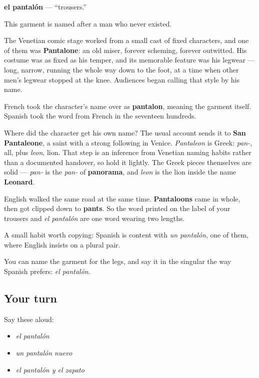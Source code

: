\begin{cousinweb}
\textbf{el pantalón} — \textquotedblleft{}trousers.\textquotedblright{}

This garment is named after a man who never existed.

The Venetian comic stage worked from a small cast of fixed characters, and one of them was \textbf{Pantalone}: an old miser, forever scheming, forever outwitted. His costume was as fixed as his temper, and its memorable feature was his legwear — long, narrow, running the whole way down to the foot, at a time when other men's legwear stopped at the knee. Audiences began calling that style by his name.

French took the character's name over as \textbf{pantalon}, meaning the garment itself. Spanish took the word from French in the seventeen hundreds.

Where did the character get his own name? The usual account sends it to \textbf{San Pantaleone}, a saint with a strong following in Venice. \emph{Pantaleon} is Greek: \emph{pan-}, all, plus \emph{leon}, lion. That step is an inference from Venetian naming habits rather than a documented handover, so hold it lightly. The Greek pieces themselves are solid — \emph{pan-} is the \emph{pan-} of \textbf{panorama}, and \emph{leon} is the lion inside the name \textbf{Leonard}.

English walked the same road at the same time. \textbf{Pantaloons} came in whole, then got clipped down to \textbf{pants}. So the word printed on the label of your trousers and \emph{el pantalón} are one word wearing two lengths.

A small habit worth copying: Spanish is content with \emph{un pantalón}, one of them, where English insists on a plural pair.
\end{cousinweb}

\begin{grammarlens}[title={What you've built}]
You can name the garment for the legs, and say it in the singular the way Spanish prefers: \emph{el pantalón}.
\end{grammarlens}

\subsection*{Your turn}
Say these aloud:

\begin{itemize}
\raggedright
  \item \emph{el pantalón}
  \item \emph{un pantalón nuevo}
  \item \emph{el pantalón y el zapato}
\end{itemize}

